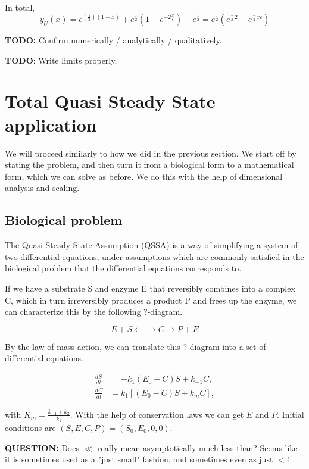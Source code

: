 \documentclass[12pt]{report}
\begin{document}
In total, $$y_U(x) = e^{(\frac 1 2)(1-x)} + e^{\frac 1 2}(1 -
		e^{-2\frac x \epsilon}) - e^{\frac 1 2} = e^{\frac 1 2}(e^{\frac -x 2}
			- e^{\frac -2x \epsilon})$$

\textbf{TODO:} Confirm numerically / analytically / qualitatively.

\textbf{TODO}: Write limits properly.

\chapter{Total Quasi Steady State application}

We will proceed similarly to how we did in the previous section. We start off by stating the problem,
and then turn it from a biological form to a mathematical form, which we can
solve as before. We do this with the help of dimensional analysis and scaling.

\section{Biological problem}

The Quasi Steady State Assumption (QSSA) is a way of simplifying a system of two differential equations, under assumptions which are commonly satisfied in the biological problem that the differential equations corresponds to.

If we have a substrate S and enzyme E that reversibly combines into a complex C, which in turn irreversibly produces a product P and frees up the enzyme, we can characterize this by the following ?-diagram.

\begin{equation}
E + S \leftarrow \rightarrow C \rightarrow P + E
\end{equation}

By the law of mass action, we can translate this ?-diagram into a set of differential equations.

\begin{align*}
\frac{dS}{dt} &= -k_1(E_0-C)S + k_{-1}C, \\
\frac{dC}{dt} &= k_1[(E_0-C)S + k_mC],
\end{align*}

with $K_m = \frac{k_{-1}+k_2}{k_1}$. With the help of conservation laws we can get $E$ and $P$. Initial conditions are $(S, E, C, P) = (S_0, E_0, 0, 0)$.

\textbf{QUESTION:} Does $\ll$ really mean asymptotically much less than? Seems like it is sometimes used as a "just small" fashion, and sometimes even as just $<1$.
\end{document}
